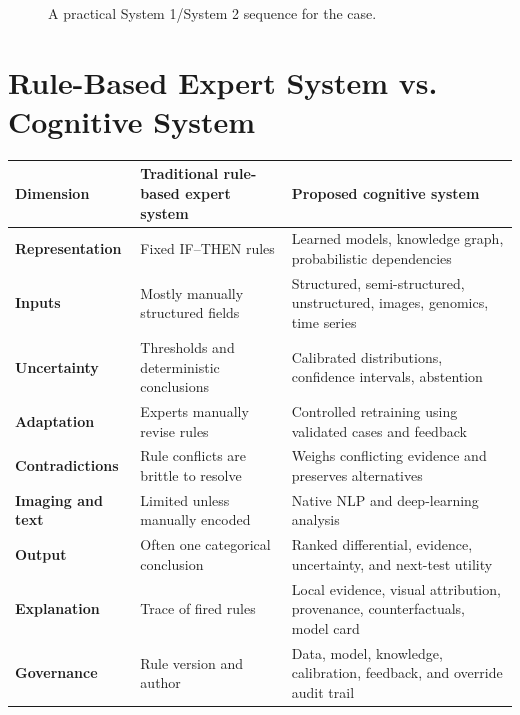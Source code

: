 \documentclass[11pt,a4paper]{article}
\begin{document}
\begin{figure}[ht]
\centering
{}
\caption{A practical System 1/System 2 sequence for the case.}
\end{figure}

\section{Rule-Based Expert System vs. Cognitive System}

\begin{tabularx}{\textwidth}{>{\bfseries}p{30mm} X X}
\toprule
Dimension & Traditional rule-based expert system & Proposed cognitive system\\
\midrule
Representation & Fixed IF--THEN rules & Learned models, knowledge graph, probabilistic dependencies\\
Inputs & Mostly manually structured fields & Structured, semi-structured, unstructured, images, genomics, time series\\
Uncertainty & Thresholds and deterministic conclusions & Calibrated distributions, confidence intervals, abstention\\
Adaptation & Experts manually revise rules & Controlled retraining using validated cases and feedback\\
Contradictions & Rule conflicts are brittle to resolve & Weighs conflicting evidence and preserves alternatives\\
Imaging and text & Limited unless manually encoded & Native NLP and deep-learning analysis\\
Output & Often one categorical conclusion & Ranked differential, evidence, uncertainty, and next-test utility\\
Explanation & Trace of fired rules & Local evidence, visual attribution, provenance, counterfactuals, model card\\
Governance & Rule version and author & Data, model, knowledge, calibration, feedback, and override audit trail\\
\bottomrule
\end{tabularx}
\end{document}
